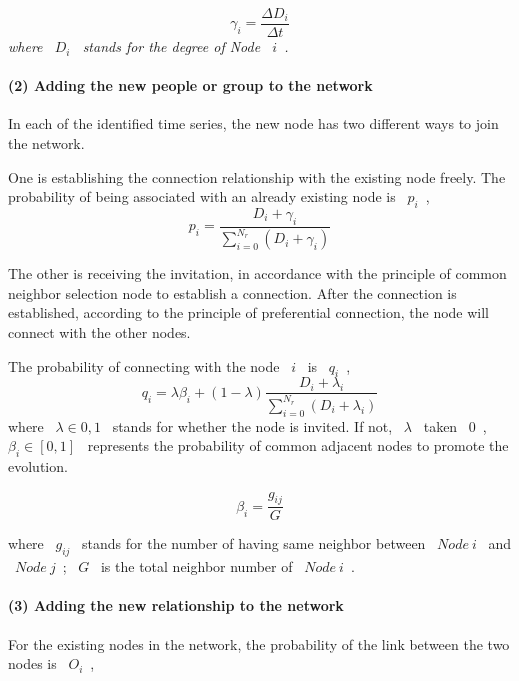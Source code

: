 \documentclass[a4paper,11pt]{article}
\begin{document}
\begin{equation}
\gamma _i=\frac{\Delta D_i}{\Delta t}
\end{equation}
\emph{where ~$D_i$~ stands for the degree of Node ~$i$~.}
\paragraph{(2) Adding the new people or group to the network}
\text{\\}
\par In each of the identified time series, the new node has two different ways to join the network.
\par One is establishing the connection relationship with the existing node freely. The probability of being associated with an already existing node is ~$p_i$~,
\begin{equation}
p_i=\frac{D_i+\gamma _i}{{\sum\limits_{i=0}^{N_r}}(D_i+\gamma _i)}
\end{equation}
\par The other is receiving the invitation, in accordance with the principle of common neighbor selection node to establish a connection. After the connection is established, according to the principle of preferential connection, the node will connect with the other nodes. 
\par The probability of connecting with the node ~$i$~ is ~$q_i$~, 
\begin{equation}
q_i=\lambda \beta _i+(1-\lambda ){\frac{{{D_i} + {\lambda _i}}}{{\sum\limits_{i = 0}^{{N_r}} {({D_i} + {\lambda _i})} }}}  
\end{equation}
where ~$\lambda\in {0,1}$~ stands for whether the node is invited. If not, ~$\lambda$~ taken ~$0$~, ~$\beta _i \in [0,1]$~ represents the probability of common adjacent nodes to promote the evolution.

\begin{equation}
\beta_i={\frac{g_{ij}}{G}}
\end{equation}

where ~$g_{ij}$~ stands for the number of having same neighbor between ~$Node~i$~ and ~$Node~j$~; ~$G$~ is the total neighbor number of ~$Node~i$~.
\paragraph{(3) Adding the new relationship to the network}
\text{\\}
\par For the existing nodes in the network, the probability of the link between the two nodes is ~$O_i$~,
\end{document}
